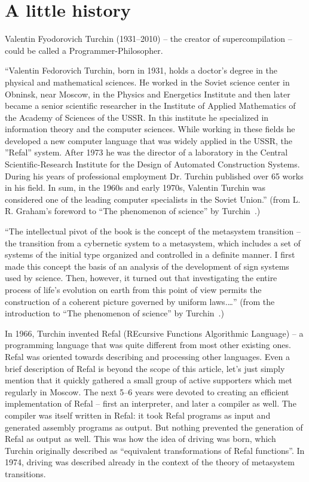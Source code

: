 \section{A little history}

Valentin Fyodorovich Turchin (1931--2010) -- the creator of supercompilation --
could be called a Programmer-Philosopher.

``Valentin Fedorovich Turchin, born in 1931, holds a doctor's degree in the physical and mathematical sciences. 
He worked in the Soviet science center in Obninsk, near Moscow, 
in the Physics and Energetics Institute and then later became a senior scientific researcher 
in the Institute of Applied Mathematics of the Academy of Sciences of the USSR. 
In this institute he specialized in information theory and the computer sciences. 
While working in these fields he developed a new computer language that was widely 
applied in the USSR, the ''Refal'' system. 
After 1973 he was the director of a laboratory in the 
Central Scientific-Research Institute for the Design of Automated Construction Systems. 
During his years of professional employment Dr. Turchin published over 65 works in his field. 
In sum, in the 1960s and early 1970s, Valentin Turchin was considered one of 
the leading computer specialists in the Soviet Union.'' 
(from L. R. Graham's foreword to ``The phenomenon of science'' by Turchin~\cite{Turchin1977Phenomenon}.)

``The intellectual pivot of the book is the concept of the metasystem transition
-- the transition from a cybernetic system to a metasystem, which includes a set 
of systems of the initial type organized and controlled in a definite manner. 
I first made this concept the basis of an analysis of the development of sign systems used by science. 
Then, however, it turned out that investigating the entire process of life's evolution on earth 
from this point of view permits the construction of a coherent picture governed by uniform laws.\ldots''
(from the introduction to ``The phenomenon of science'' by Turchin~\cite{Turchin1977Phenomenon}.)

In 1966, Turchin invented Refal (REcursive Functions Algorithmic Language) --
a programming language that was quite different from most other existing ones.
Refal was oriented towards describing and processing other languages.
Even a brief description of Refal is beyond the scope of this article, 
let's just simply mention that it quickly gathered a small group of active supporters
which met regularly in Moscow. 
The next 5--6 years were devoted to creating an efficient implementation of Refal
-- first an interpreter, and later a compiler as well.
The compiler was itself written in Refal: it took Refal programs as input
and generated assembly programs as output.
But nothing prevented the generation of Refal as output as well.
This was how the idea of driving was born, which Turchin
originally described as ``equivalent transformations of Refal functions''.
In 1974, driving was described already in the context of the
theory of metasystem transitions.

